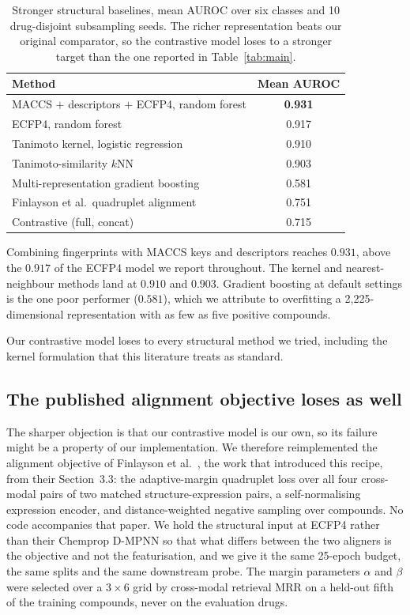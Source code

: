 \documentclass[conference]{IEEEtran}
\begin{document}
\begin{table}[t]
\centering\small
\caption{Stronger structural baselines, mean AUROC over six classes and 10
drug-disjoint subsampling seeds. The richer representation beats our original
comparator, so the contrastive model loses to a stronger target than the one
reported in Table~\ref{tab:main}.}
\label{tab:strong}
\setlength{\tabcolsep}{4pt}
\begin{tabular}{lc}
\toprule
Method & Mean AUROC \\
\midrule
MACCS $+$ descriptors $+$ ECFP4, random forest & \textbf{0.931} \\
ECFP4, random forest & 0.917 \\
Tanimoto kernel, logistic regression & 0.910 \\
Tanimoto-similarity $k$NN & 0.903 \\
Multi-representation gradient boosting & 0.581 \\
\midrule
Finlayson et al.\ quadruplet alignment~\cite{finlayson2021} & 0.751 \\
Contrastive (full, concat) & 0.715 \\
\bottomrule
\end{tabular}
\end{table}

Combining fingerprints with MACCS keys and descriptors reaches $0.931$, above
the $0.917$ of the ECFP4 model we report throughout. The kernel and
nearest-neighbour methods land at $0.910$ and $0.903$. Gradient boosting at
default settings is the one poor performer ($0.581$), which we attribute to
overfitting a 2{,}225-dimensional representation with as few as five positive
compounds.

Our contrastive model loses to every structural method we tried, including the
kernel formulation that this literature treats as standard.

\subsection{The published alignment objective loses as well}
\label{sec:published}

The sharper objection is that our contrastive model is our own, so its failure
might be a property of our implementation. We therefore reimplemented the
alignment objective of Finlayson et al.~\cite{finlayson2021}, the work that
introduced this recipe, from their Section~3.3: the adaptive-margin quadruplet
loss over all four cross-modal pairs of two matched structure-expression pairs,
a self-normalising expression encoder, and distance-weighted negative sampling
over compounds. No code accompanies that paper. We hold the structural input at
ECFP4 rather than their Chemprop D-MPNN so that what differs between the two
aligners is the objective and not the featurisation, and we give it the same
25-epoch budget, the same splits and the same downstream probe. The margin
parameters $\alpha$ and $\beta$ were selected over a $3 \times 6$ grid by
cross-modal retrieval MRR on a held-out fifth of the training compounds, never
on the evaluation drugs.
\end{document}
